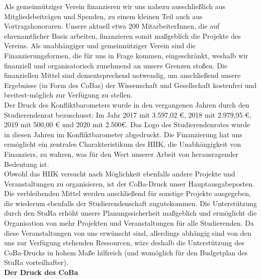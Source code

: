 {    Als gemeinnütziger Verein finanzieren wir uns nahezu ausschließlich aus Mitgliedsbeiträgen und Spenden, zu einem kleinen Teil auch aus Vortragshonoraren. Unsere aktuell etwa 200 MitarbeiterInnen, die auf ehrenamtlicher Basis arbeiten, finanzieren somit maßgeblich die Projekte des Vereins. Als unabhängiger und gemeinnütziger Verein sind die Finanzierungsformen, die für uns in Frage kommen, eingeschränkt, weshalb wir finanziell und organisatorisch zunehmend an unsere Grenzen stoßen. Die finanziellen Mittel sind dementsprechend notwendig, um anschließend unsere Ergebnisse (in Form des CoBas) der Wissenschaft und Gesellschaft kostenfrei und breitest-möglich zur Verfügung zu stellen.\\
    Der Druck des Konfliktbarometers wurde in den vergangenen Jahren durch den Studierendenrat bezuschusst: Im Jahr 2017 mit 3.597,02 €, 2018 mit 2.979,95 €, 2019 mit 500,00 € und 2020 mit 2.500€. Das Logo des Studierendenrates wurde in diesen Jahren im Konfliktbarometer abgedruckt. Die Finanzierung hat uns ermöglicht ein zentrales Charakteristikum des HIIK, die Unabhängigkeit von Finanziers, zu wahren, was für den Wert unserer Arbeit von herausragender Bedeutung ist.\\
    Obwohl das HIIK versucht nach Möglichkeit ebenfalls andere Projekte und Veranstaltungen zu organisieren, ist der CoBa-Druck unser Hauptausgabeposten. Die verbleibenden Mittel werden anschließend für sonstige Projekte ausgegeben, die wiederum ebenfalls der Studierendenschaft zugutekommen. Die Unterstützung durch den StuRa erhöht unsere Planungssicherheit maßgeblich und ermöglicht die Organisation von mehr Projekten und Veranstaltungen für alle Studierenden. Da diese Veranstaltungen von uns erwünscht sind, allerdings abhängig sind von den uns zur Verfügung stehenden Ressourcen, wäre deshalb die Unterstützung des CoBa-Drucks in hohem Maße hilfreich (und womöglich für den Budgetplan des StuRa vorteilhafter).\\[1em]
    \textbf{Der Druck des CoBa}\\
}
